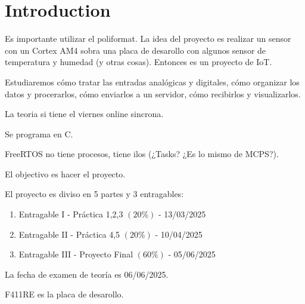\chapter{Introduction}

Es importante utilizar el poliformat. 
La idea del proyecto es realizar un sensor con un Cortex AM4 sobra una placa de desarollo con algunos sensor de temperatura y humedad (y otras cosas).
Entonces es un proyecto de IoT.

Estudiaremos cómo tratar las entradas analógicas y digitales, cómo organizar los datos y procerarlos, cómo enviarlos a un servidor, cómo recibirlos y visualizarlos.

La teoria si tiene el viernes online sincrona.

Se programa en C.

FreeRTOS no tiene procesos, tiene ilos (¿Tasks? ¿Es lo mismo de MCPS?).

El objectivo es hacer el proyecto.

El proyecto es diviso en 5 partes y 3 entragables:
\begin{enumerate}
   \item Entragable I - Práctica 1,2,3 $(20\%)$ - 13/03/2025
   \item Entragable II - Práctica 4,5 $(20\%)$ - 10/04/2025
   \item Entragable III - Proyecto Final $(60\%)$ - 05/06/2025
\end{enumerate}

La fecha de examen de teoría es 06/06/2025.

F411RE es la placa de desarollo.

